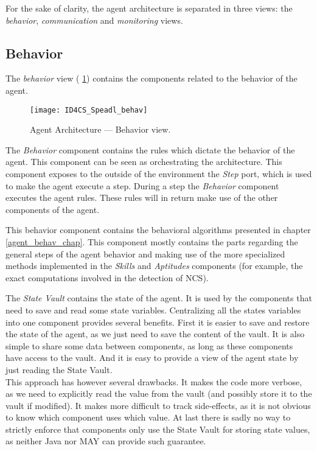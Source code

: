 For the sake of clarity, the agent architecture is separated in three views: the \emph{behavior}, \emph{communication} and \emph{monitoring} views.

\subsection{Behavior}

The \emph{behavior} view (\figurename{} \ref{Arch-behavior}) contains the components related to the behavior of the agent. 

\begin{figure}
\centering
\texttt{[image: ID4CS\_Speadl\_behav]}
\caption{Agent Architecture --- Behavior view.}
\label{Arch-behavior}
\end{figure}

The \emph{Behavior} component contains the rules which dictate the behavior of the agent. This component can be seen as orchestrating the architecture. This component exposes to the outside of the environment the \emph{Step} port, which is used to make the agent execute a step. During a step the \emph{Behavior} component executes the agent rules. These rules will in return make use of the other components of the agent.

This behavior component contains the behavioral algorithms presented in chapter \ref{agent_behav_chap}. This component mostly contains the parts regarding the general steps of the agent behavior and making use of the more specialized methods implemented in the \emph{Skills} and \emph{Aptitudes} components (for example, the exact computations involved in the detection of NCS).

The \emph{State Vault} contains the state of the agent. It is used by the components that need to save and read some state variables. Centralizing all the states variables into one component provides several benefits. First it is easier to save and restore the state of the agent, as we just need to save the content of the vault. It is also simple to share some data between components, as long as these components have access to the vault. And it is easy to provide a view of the agent state by just reading the State Vault.\\
This approach has however several drawbacks. It makes the code more verbose, as we need to explicitly read the value from the vault (and possibly store it to the vault if modified). It makes more difficult to track side-effects, as it is not obvious to know which component uses which value. At last there is sadly no way to strictly enforce that components only use the State Vault for storing state values, as neither Java nor MAY can provide such guarantee.

